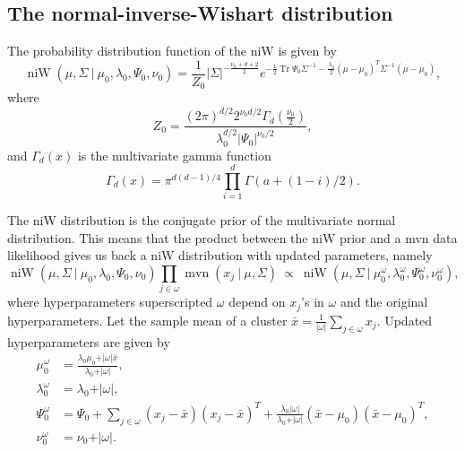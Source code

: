 \documentclass[11pt, oneside]{article}   	%
\DeclareMathOperator{\Tr}{Tr}
\DeclareMathOperator{\niW}{niW}
\begin{document}
\subsection{The normal-inverse-Wishart distribution}
The probability distribution function of the niW is given by
\begin{equation}
\niW(\mu, \Sigma~\vert~\mu_0, \lambda_0,\Psi_0,\nu_0) = \frac{1}{Z_0} \vert\Sigma\vert^{-\frac{\nu_0 + d + 2}{2}}e^{-\frac{1}{2}\Tr\Psi_0\Sigma^{-1} - \frac{\lambda_0}{2}(\mu - \mu_0)^T\Sigma^{-1}(\mu - \mu_0)},
\label{eq:niW}\end{equation}
where 
\begin{equation}\label{eq:Z0}
Z_0 = \frac{(2\pi)^{d/2} 2^{\nu_0 d/2} \Gamma_d(\frac{\nu_0}{2})}{\lambda_0^{d/2}\vert\Psi_0\vert^{\nu_0/2}},
\end{equation}
and $\Gamma_d(x)$ is the multivariate gamma function
$$\Gamma_d(x) = \pi^{d(d-1)/4}\prod_{i=1}^d\Gamma(a + (1 - i)/2).$$

The niW distribution is the conjugate prior of the multivariate normal distribution. This means that the product between the niW prior and a mvn data likelihood gives us back a niW distribution with updated parameters, namely
\begin{equation}\niW(\mu, \Sigma~\vert~ \mu_0, \lambda_0,\Psi_0,\nu_0)\prod_{j\in\omega}\operatorname{mvn}(x_j~\vert~\mu,\Sigma)~\propto~\niW(\mu,\Sigma~\vert~\mu_0^\omega,\lambda_0^\omega,\Psi_0^\omega,\nu_0^\omega),
\label{eq:conjugation}\end{equation}
where hyperparameters superscripted $\omega$ depend on $x_j$'s in $\omega$ and the original hyperparameters. Let the sample mean of a cluster $\bar x = \frac{1}{\vert\omega\vert}\sum_{j\in\omega} x_j$. Updated hyperparameters are given by
\begin{equation}\begin{split}
\mu_0^\omega &= \frac{\lambda_0 \mu_0 + \vert\omega\vert \bar x}{\lambda_0 + \vert\omega\vert}, \\
\lambda_0^\omega &= \lambda_0 + \vert\omega\vert,\\
\Psi_0^\omega &= \Psi_0 + \sum_{j\in\omega}(x_j - \bar x)(x_j - \bar x)^T + \frac{\lambda_0\vert\omega\vert}{\lambda_0 + \vert\omega\vert}(\bar x - \mu_0)(\bar x - \mu_0)^T,\\
\nu_0^\omega &= \nu_0 + \vert\omega\vert.
\label{eq:updatedhp}\end{split}\end{equation}
\end{document}
